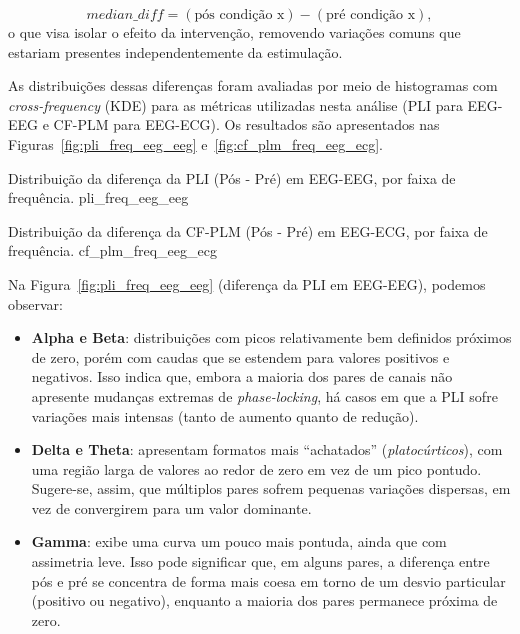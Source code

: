 \[
\textit{median\_diff} = (\text{pós condição x}) - (\text{pré condição x}),
\]
o que visa isolar o efeito da intervenção, removendo variações comuns que estariam presentes independentemente da estimulação.

As distribuições dessas diferenças foram avaliadas por meio de histogramas com \textit{cross-frequency} (KDE) para as métricas utilizadas nesta análise (PLI para EEG-EEG e CF-PLM para EEG-ECG). Os resultados são apresentados nas Figuras~\ref{fig:pli_freq_eeg_eeg} e~\ref{fig:cf_plm_freq_eeg_ecg}.

{Distribuição da diferença da PLI (Pós - Pré) em EEG-EEG, por faixa de frequência.}
{pli_freq_eeg_eeg}

{Distribuição da diferença da CF-PLM (Pós - Pré) em EEG-ECG, por faixa de frequência.}
{cf_plm_freq_eeg_ecg}

Na Figura~\ref{fig:pli_freq_eeg_eeg} (diferença da PLI em EEG-EEG), podemos observar:
\begin{itemize}
    \item \textbf{Alpha e Beta}: distribuições com picos relativamente bem definidos próximos de zero, porém com caudas que se estendem para valores positivos e negativos. Isso indica que, embora a maioria dos pares de canais não apresente mudanças extremas de \emph{phase-locking}, há casos em que a PLI sofre variações mais intensas (tanto de aumento quanto de redução).
    \item \textbf{Delta e Theta}: apresentam formatos mais ``achatados'' (\emph{platocúrticos}), com uma região larga de valores ao redor de zero em vez de um pico pontudo. Sugere-se, assim, que múltiplos pares sofrem pequenas variações dispersas, em vez de convergirem para um valor dominante.
    \item \textbf{Gamma}: exibe uma curva um pouco mais pontuda, ainda que com assimetria leve. Isso pode significar que, em alguns pares, a diferença entre pós e pré se concentra de forma mais coesa em torno de um desvio particular (positivo ou negativo), enquanto a maioria dos pares permanece próxima de zero.
\end{itemize}

